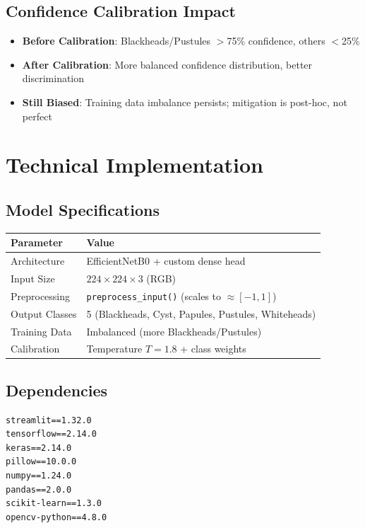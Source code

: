 \documentclass[12pt,a4paper]{article}
\begin{document}
\subsection{Confidence Calibration Impact}

\begin{itemize}
    \item \textbf{Before Calibration}: Blackheads/Pustules $>$75\% confidence, others $<$25\%
    \item \textbf{After Calibration}: More balanced confidence distribution, better discrimination
    \item \textbf{Still Biased}: Training data imbalance persists; mitigation is post-hoc, not perfect
\end{itemize}

\section{Technical Implementation}

\subsection{Model Specifications}

\begin{center}
\begin{tabular}{|l|l|}
\hline
\textbf{Parameter} & \textbf{Value} \\
\hline
Architecture & EfficientNetB0 + custom dense head \\
Input Size & $224 \times 224 \times 3$ (RGB) \\
Preprocessing & \texttt{preprocess\_input()} (scales to $\approx [-1, 1]$) \\
Output Classes & 5 (Blackheads, Cyst, Papules, Pustules, Whiteheads) \\
Training Data & Imbalanced (more Blackheads/Pustules) \\
Calibration & Temperature $T=1.8$ + class weights \\
\hline
\end{tabular}
\end{center}

\subsection{Dependencies}

\begin{lstlisting}
streamlit==1.32.0
tensorflow==2.14.0
keras==2.14.0
pillow==10.0.0
numpy==1.24.0
pandas==2.0.0
scikit-learn==1.3.0
opencv-python==4.8.0
\end{lstlisting}
\end{document}
